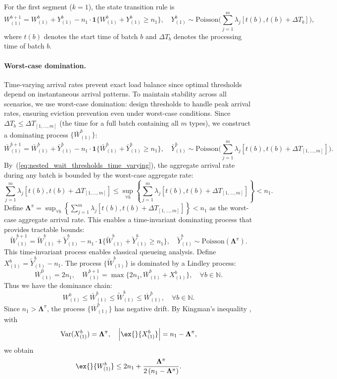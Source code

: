 For the first segment ($k=1$), the state transition rule is
$$ W_{(1)}^{b+1} = W_{(1)}^{b} + Y_{(1)}^b  - n_1 \cdot \mathbf{1}\{ W_{(1)}^{b} + Y_{(1)}^b \geq n_1 \},  \quad Y_{(1)}^b \sim \text{Poisson}\Big( \sum_{j=1}^m \lambda_j[t(b), t(b)+ \Delta T_b] \Big),  $$
where $t(b)$ denotes the start time of batch $b$ and $\Delta T_b$ denotes the processing time of batch $b$.

\paragraph{Worst-case domination.} Time-varying arrival rates prevent exact load balance since optimal thresholds depend on instantaneous arrival patterns. To maintain stability across all scenarios, we use worst-case domination: design thresholds to handle peak arrival rates, ensuring eviction prevention even under worst-case conditions. Since $\Delta T_b\leq \Delta T_{[1,\dots,m]}$ (the time for a full batch containing all $m$ types), we construct a dominating process $\{\bar{W}_{(1)}^{b}\}$:
$$ \bar{W}_{(1)}^{b+1} = \bar{W}_{(1)}^{b} + \bar{Y}_{(1)}^b  - n_1 \cdot \mathbf{1}\{ \bar{W}_{(1)}^{b} + \bar{Y}_{(1)}^b \geq n_1 \},  \quad \bar{Y}_{(1)}^b \sim \text{Poisson}\Big(  \sum_{j=1}^m \lambda_j[t(b), t(b)+\Delta T_{[1,\dots,m]}] \Big).  $$
By~(\ref{eq:nested_wait_thresholds_time_varying}), the aggregate arrival rate during any batch is bounded by the worst-case aggregate rate:
$$ \sum_{j=1}^m \lambda_j[t(b), t(b)+\Delta T_{[1,\dots,m]}] \leq \sup_{\forall b}\left\{\sum_{j=1}^m \lambda_j[t(b), t(b)+\Delta T_{[1,\dots,m]}] \right\} < n_1.$$
Define $\mathbf{\Lambda}^{\pi} = \sup_{\forall b}\left\{\sum_{j=1}^m \lambda_j[t(b), t(b)+\Delta T_{[1,\dots,m]}] \right\} < n_1$ as the worst-case aggregate arrival rate. This enables a time-invariant dominating process that provides tractable bounds:
$$ \tilde{W}_{(1)}^{b+1} = \tilde{W}_{(1)}^{b} + \tilde{Y}_{(1)}^b  - n_1 \cdot \mathbf{1}\{ \tilde{W}_{(1)}^{b} + \tilde{Y}_{(1)}^b \geq n_1 \},  \quad \tilde{Y}_{(1)}^b \sim \text{Poisson}(\mathbf{\Lambda}^{\pi}).  $$
This time-invariant process enables classical queueing analysis. Define $X_{(1)}^b = \tilde{Y}_{(1)}^b - n_1$. The process $\{ \tilde{W}_{(1)}^{b}\}$ is dominated by a Lindley process:
$$ \overline{W}_{(1)}^{0} = 2n_1,\quad  \overline{W}_{(1)}^{b+1} = \max \{  2n_1, \overline{W}_{(1)}^{b} + X_{(1)}^b \},\quad \forall b \in \mathbb{N}. $$
Thus we have the dominance chain:
$$ W_{(1)}^{b}\leq \bar{W}_{(1)}^{b} \leq \tilde{W}_{(1)}^{b} \leq \overline{W}_{(1)}^{b}, \quad \forall b \in \mathbb{N}.$$
Since $n_1> \mathbf{\Lambda}^{\pi}$, the process $\{\overline{W}_{(1)}^{b} \}$ has negative drift. By Kingman's inequality \citep{kingman1962queues}, with
$$\text{Var}(X_{(1)}^b ) = \mathbf{\Lambda}^{\pi},\quad \left|  \ex{}{X_{(1)}^b} \right| = n_1 - \mathbf{\Lambda}^{\pi},$$
we obtain
$$  \ex{}{W_{(1)}^b}\leq  2n_1 + \frac{\mathbf{\Lambda}^{\pi}}{2\left(n_1 -\mathbf{\Lambda}^{\pi}\right)}. $$
